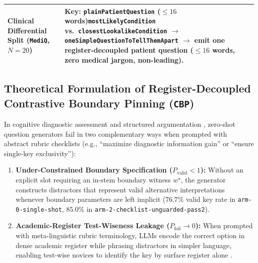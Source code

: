 \documentclass[11pt,a4paper]{article}
\begin{document}
\begin{table}[t]
\begin{tabular}{@{}p{}p{}@{}}
\midrule
\textbf{Clinical Differential Split} (\texttt{MediQ}, $N=20$) & \textbf{Key:} \texttt{plainPatientQuestion} ($\le 16$ words)\newline \texttt{mostLikelyCondition} vs.\ \texttt{closestLookalike\allowbreak Condition} $\to$ \texttt{oneSimpleQuestion\allowbreak ToTellThemApart} $\to$ emit one register-decoupled patient question ($\le 16$ words, zero medical jargon, non-leading). \\
\bottomrule
\end{tabular}
\end{table}

\subsection{Theoretical Formulation of Register-Decoupled Contrastive Boundary Pinning (\texttt{CBP})}
In cognitive diagnostic assessment \cite{haladyna2002developing,lord1980applications,gierl2017developing} and structured argumentation \cite{toulmin2003uses}, zero-shot question generators fail in two complementary ways when prompted with abstract rubric checklists (e.g., ``maximize diagnostic information gain'' or ``ensure single-key exclusivity''):
\begin{enumerate}
  \item \textbf{Under-Constrained Boundary Specification ($P_{\text{valid}} < 1$):} Without an explicit slot requiring an in-stem boundary witness $w^\star$, the generator constructs distractors that represent valid alternative interpretations whenever boundary parameters are left implicit ($76.7\%$ valid key rate in \texttt{arm-0-single-shot}, $85.0\%$ in \texttt{arm-2-checklist-unguarded-pass2}).
  \item \textbf{Academic-Register Test-Wiseness Leakage ($P_{\text{foil}} \to 0$):} When prompted with meta-linguistic rubric terminology, LLMs encode the correct option in dense academic register while phrasing distractors in simpler language, enabling test-wise novices to identify the key by surface register alone \cite{haladyna2002developing}.
\end{enumerate}
\end{document}
